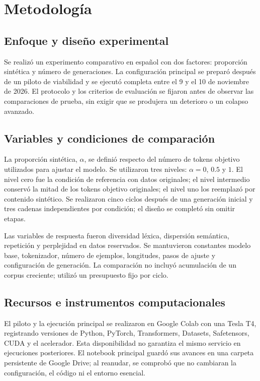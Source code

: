\documentclass[12pt,letterpaper]{article}
\begin{document}
\section{Metodología}

\subsection{Enfoque y diseño experimental}

Se realizó un experimento comparativo en español con dos factores:
proporción sintética y número de generaciones. La configuración principal
se preparó después de un piloto de viabilidad y se ejecutó completa entre
el 9 y el 10 de noviembre de 2026. El protocolo y los criterios de
evaluación se fijaron antes de observar las comparaciones de prueba, sin
exigir que se produjera un deterioro o un colapso avanzado.

\subsection{Variables y condiciones de comparación}

La proporción sintética, \(\alpha\), se definió respecto del número de
tokens objetivo utilizados para ajustar el modelo. Se utilizaron tres niveles:
\(\alpha=0\), \(0.5\) y \(1\). El nivel cero fue la condición de referencia
con datos originales; el nivel intermedio conservó la mitad de los tokens
objetivo originales; el nivel uno los reemplazó por contenido sintético.
Se realizaron cinco ciclos después de una generación inicial y tres cadenas
independientes por condición; el diseño se completó sin omitir etapas.

Las variables de respuesta fueron diversidad léxica, dispersión semántica,
repetición y perplejidad en datos reservados. Se mantuvieron constantes
modelo base, tokenizador, número de ejemplos, longitudes, pasos de ajuste
y configuración de generación. La comparación no incluyó acumulación de
un corpus creciente; utilizó un presupuesto fijo por ciclo.

\subsection{Recursos e instrumentos computacionales}

El piloto y la ejecución principal se realizaron en Google Colab con una
Tesla T4, registrando versiones de Python, PyTorch, Transformers, Datasets,
Safetensors, CUDA y el acelerador. Esta disponibilidad no garantiza el
mismo servicio en ejecuciones posteriores. El notebook principal guardó
sus avances en una carpeta persistente de Google Drive; al reanudar, se
comprobó que no cambiaran la configuración, el código ni el entorno esencial.
\end{document}
